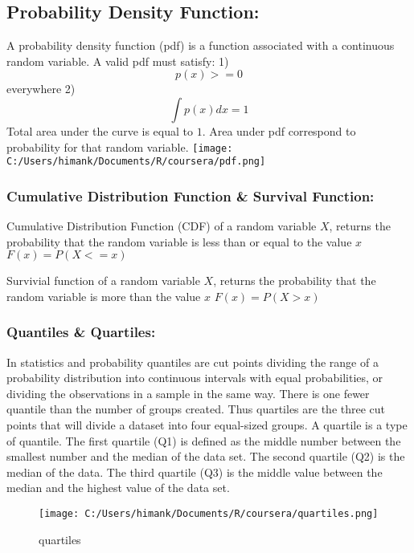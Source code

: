 \documentclass[]{article}
\begin{document}
\hypertarget{probability-density-function}{%
\subsection{Probability Density
Function:}\label{probability-density-function}}

A probability density function (pdf) is a function associated with a
continuous random variable. A valid pdf must satisfy: 1) \[p(x)>=0\]
everywhere 2) \[ \int p(x)dx=1 \] Total area under the curve is equal to
\(1\). Area under pdf correspond to probability for that random
variable. \texttt{[image: C:/Users/himank/Documents/R/coursera/pdf.png]}

\hypertarget{cumulative-distribution-function-survival-function}{%
\subsubsection{Cumulative Distribution Function \& Survival
Function:}\label{cumulative-distribution-function-survival-function}}

Cumulative Distribution Function (CDF) of a random variable \(X\),
returns the probability that the random variable is less than or equal
to the value \(x\) \(F(x)=P(X<=x)\)

Survivial function of a random variable \(X\), returns the probability
that the random variable is more than the value \(x\) \(F(x)=P(X>x)\)

\hypertarget{quantiles-quartiles}{%
\subsubsection{Quantiles \& Quartiles:}\label{quantiles-quartiles}}

In statistics and probability quantiles are cut points dividing the
range of a probability distribution into continuous intervals with equal
probabilities, or dividing the observations in a sample in the same way.
There is one fewer quantile than the number of groups created. Thus
quartiles are the three cut points that will divide a dataset into four
equal-sized groups. A quartile is a type of quantile. The first quartile
(Q1) is defined as the middle number between the smallest number and the
median of the data set. The second quartile (Q2) is the median of the
data. The third quartile (Q3) is the middle value between the median and
the highest value of the data set.

\begin{figure}
\centering
\texttt{[image: C:/Users/himank/Documents/R/coursera/quartiles.png]}
\caption{quartiles}
\end{figure}
\end{document}
